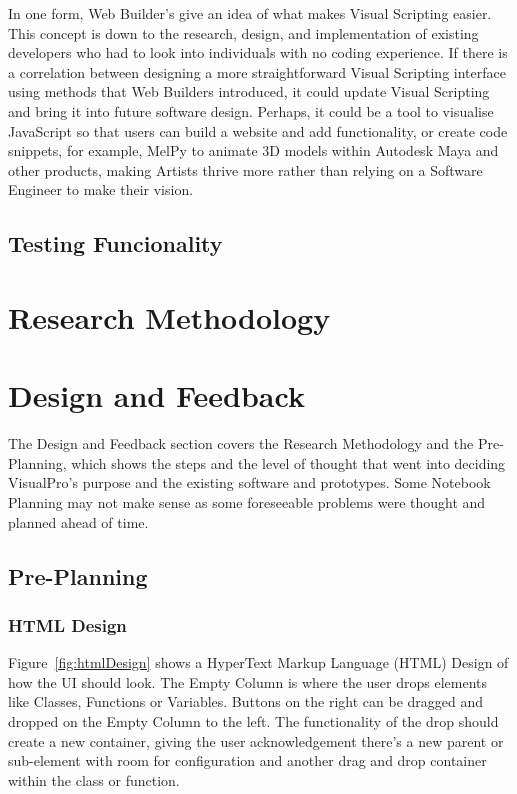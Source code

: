 \documentclass[12pt]{report} %
\begin{document}
			In one form, Web Builder's give an idea of what makes Visual Scripting easier. This concept is down to the research, design, and implementation of existing developers who had to look into individuals with no coding experience. If there is a correlation between designing a more straightforward Visual Scripting interface using methods that Web Builders introduced, it could update Visual Scripting and bring it into future software design. Perhaps, it could be a tool to visualise JavaScript so that users can build a website and add functionality, or create code snippets, for example, MelPy to animate 3D models within Autodesk Maya and other products, making Artists thrive more rather than relying on a Software Engineer to make their vision.

	\section{Testing Funcionality}
	
\chapter{Research Methodology}
\label{chap:researchMethodology}


\chapter{Design and Feedback}
\label{chap:designAndFeedback}
	The Design and Feedback section covers the Research Methodology and the Pre-Planning, which shows the steps and the level of thought that went into deciding VisualPro's purpose and the existing software and prototypes. Some Notebook Planning may not make sense as some foreseeable problems were thought and planned ahead of time.
	
	\section{Pre-Planning}
		\subsection{HTML Design} 
			Figure~\ref{fig:htmlDesign} shows a HyperText Markup Language (HTML) Design of how the UI should look. The Empty Column is where the user drops elements like Classes, Functions or Variables. Buttons on the right can be dragged and dropped on the Empty Column to the left. The functionality of the drop should create a new container, giving the user acknowledgement there's a new parent or sub-element with room for configuration and another drag and drop container within the class or function.
\end{document}
